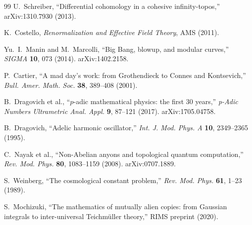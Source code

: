 \documentclass[12pt,a4paper]{article}
\theoremstyle{definition}
\begin{document}
\begin{thebibliography}{99}
U.~Schreiber, ``Differential cohomology in a cohesive infinity-topos,'' arXiv:1310.7930 (2013).

K.~Costello, \textit{Renormalization and Effective Field Theory}, AMS (2011).

Yu.~I.~Manin and M.~Marcolli, ``Big Bang, blowup, and modular curves,'' \textit{SIGMA} \textbf{10}, 073 (2014). arXiv:1402.2158.

P.~Cartier, ``A mad day's work: from Grothendieck to Connes and Kontsevich,'' \textit{Bull. Amer. Math. Soc.} \textbf{38}, 389--408 (2001).

B.~Dragovich et al., ``$p$-adic mathematical physics: the first 30 years,'' \textit{p-Adic Numbers Ultrametric Anal. Appl.} \textbf{9}, 87--121 (2017). arXiv:1705.04758.

B.~Dragovich, ``Adelic harmonic oscillator,'' \textit{Int. J. Mod. Phys. A} \textbf{10}, 2349--2365 (1995).

C.~Nayak et al., ``Non-Abelian anyons and topological quantum computation,'' \textit{Rev. Mod. Phys.} \textbf{80}, 1083--1159 (2008). arXiv:0707.1889.

S.~Weinberg, ``The cosmological constant problem,'' \textit{Rev. Mod. Phys.} \textbf{61}, 1--23 (1989).

S.~Mochizuki, ``The mathematics of mutually alien copies: from Gaussian integrals to inter-universal Teichm\"{u}ller theory,'' RIMS preprint (2020).

\end{thebibliography}
\end{document}
